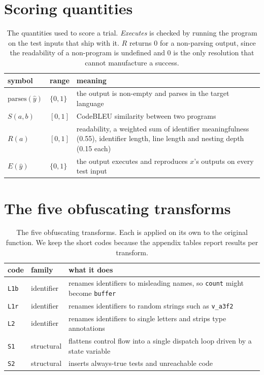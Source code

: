 \documentclass{article}
\newcommand{\arm}[1]{\texttt{#1}}
\begin{document}
\section{Scoring quantities}
\label{app:metrics}
\begin{table}[h]
\centering\footnotesize
\caption{The quantities used to score a trial. \emph{Executes} is checked by running the
program on the test inputs that ship with it. $R$ returns 0 for a non-parsing output, since
the readability of a non-program is undefined and 0 is the only resolution that cannot
manufacture a success.}
\label{tab:metrics}
\begin{tabular}{llp{6.7cm}}
\toprule
symbol & range & meaning \\
\midrule
$\mathrm{parses}(\hat y)$ & $\{0,1\}$ & the output is non-empty and parses in the target
language \\
$S(a,b)$ & $[0,1]$ & CodeBLEU similarity between two programs
\citep{ren2020codebleu} \\
$R(a)$ & $[0,1]$ & readability, a weighted sum of identifier meaningfulness (0.55),
identifier length, line length and nesting depth (0.15 each) \\
$E(\hat y)$ & $\{0,1\}$ & the output executes and reproduces $x$'s outputs on every test input \\
\bottomrule
\end{tabular}
\end{table}

\section{The five obfuscating transforms}
\label{app:conditions}
\begin{table}[h]
\centering\small
\caption{The five obfuscating transforms. Each is applied on its own to the original
function. We keep the short codes because the appendix tables report results per
transform.}
\label{tab:conditions}
\begin{tabular}{llp{7.1cm}}
\toprule
code & family & what it does \\
\midrule
\arm{L1b} & identifier & renames identifiers to misleading names, so \texttt{count} might
become \texttt{buffer} \\
\arm{L1r} & identifier & renames identifiers to random strings such as \texttt{v\_a3f2} \\
\arm{L2} & identifier & renames identifiers to single letters and strips type annotations \\
\arm{S1} & structural & flattens control flow into a single dispatch loop driven by a state
variable \\
\arm{S2} & structural & inserts always-true tests and unreachable code \\
\bottomrule
\end{tabular}
\end{table}
\end{document}
